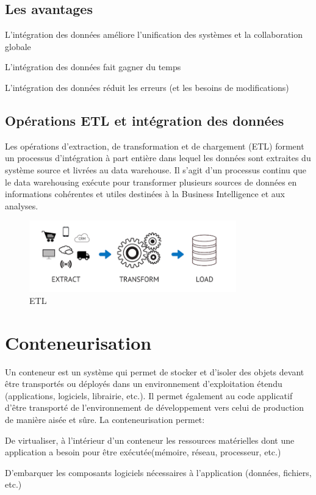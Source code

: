 \subsection{Les avantages}
\begin{list}{•}
	\item L’intégration des données améliore l’unification des systèmes et la collaboration globale
	\item L’intégration des données fait gagner du temps
	\item L’intégration des données réduit les erreurs (et les besoins de modifications)
\end{list}
\subsection{Opérations ETL et intégration des données}
Les opérations d’extraction, de transformation et de chargement (ETL) forment un processus d’intégration
à part entière dans lequel les données sont extraites du système source et livrées au data warehouse. Il s’agit
d’un processus continu que le data warehousing exécute pour transformer plusieurs sources de données en
informations cohérentes et utiles destinées à la Business Intelligence et aux analyses.
 \begin{figure}[H]
            \centering
                \includegraphics[width=0.8\textwidth]{Figures/etl}
	       \decoRule
		\caption[ETL]{ETL}
	\label{fig:ETL}
	\end{figure}
\newpage
\section{Conteneurisation}
Un conteneur est un système qui permet de stocker et d’isoler des objets devant être transportés ou déployés dans un environnement d’exploitation étendu (applications, logiciels, librairie, etc.). Il permet également au code applicatif d’être transporté de l’environnement de développement vers celui de production de manière aisée et sûre.  
La conteneurisation permet:

\begin{list}{•}
	\item De virtualiser, à l’intérieur d’un conteneur les ressources matérielles dont une application a besoin pour être exécutée(mémoire, réseau, processeur, etc.) 
	\item
	\item D'embarquer les composants logiciels nécessaires à l’application (données, fichiers, etc.)  
\end{list}

